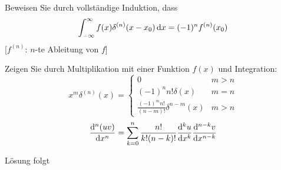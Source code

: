 \documentclass{atistandalonetask}
\begin{document}
  \begin{atiTask}[
    title = Die Ableitung der Delta-Distribution
  ]
    \begin{atiSubtasks}
    	\item Beweisen Sie durch vollständige Induktion, dass
    	\[
    	\int_{-\infty}^{\infty} f(x)\delta^{(n)}(x-x_0)\,\mathrm{d} x=(-1)^nf^{(n)}(x_0)
    	\]
    	[$f^{(n)}$: $n$-te Ableitung von $f$]
    	\item Zeigen Sie durch Multiplikation mit einer Funktion $f(x)$ und Integration:
    	\[
    	x^m\delta^{(n)}(x)=\begin{cases}
    	0 & m>n\\
    	(-1)^n n!\delta(x)& m=n\\
    	\frac{(-1)^m n!}{(n-m)!}\delta^{n-m}(x) & m>n
    	\end{cases}
    	\]
		\[
		\leibnizDerivative[n]{(uv)}{x}=\sum _{k=0}^n \frac{n!}{k! (n-k)!}\leibnizDerivative[k]{u}{x}\leibnizDerivative[n-k]{v}{x}
		\]
    \end{atiSubtasks}	
  \end{atiTask}
  \begin{atiSolution}
  	Lösung folgt
%  
  \end{atiSolution}
\end{document}
